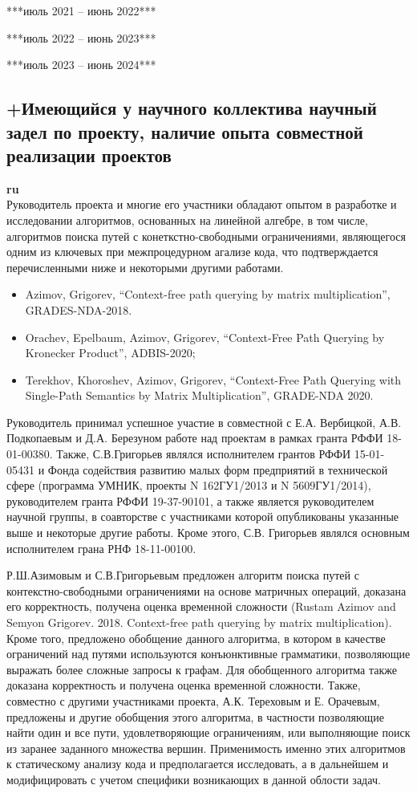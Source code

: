 \documentclass[12pt]{article}  %
\theoremstyle{remark}
\begin{document}
***июль 2021 -- июнь 2022***


***июль 2022 -- июнь 2023***


***июль 2023 -- июнь 2024***


\subsection{+Имеющийся у научного коллектива научный задел по проекту, наличие опыта совместной реализации проектов}

\textbf{ru}\\

Руководитель проекта и многие его участники обладают опытом в разработке и исследовании алгоритмов, основанных на линейной алгебре, в том числе, алгоритмов поиска путей с конеткстно-свободными ограничениями, являющегося одним из ключевых при межпроцедурном агализе кода, что подтверждается перечисленными ниже и некоторыми другими работами.
\begin{itemize}
  \item Azimov, Grigorev, ``Context-free path querying by matrix multiplication'', GRADES-NDA-2018.
  \item Orachev, Epelbaum, Azimov, Grigorev, ``Context-Free Path Querying by Kronecker Product'', ADBIS-2020;
  \item Terekhov, Khoroshev, Azimov, Grigorev, ``Context-Free Path Querying with Single-Path Semantics by Matrix Multiplication'', GRADE-NDA 2020.
\end{itemize}

Руководитель принимал успешное участие в совместной с Е.А. Вербицкой, А.В. Подкопаевым и Д.А. Березуном работе над проектам в рамках гранта РФФИ 18-01-00380. Также, С.В.Григорьев являлся исполнителем грантов РФФИ 15-01-05431 и Фонда содействия развитию малых форм предприятий в технической сфере (программа УМНИК, проекты N 162ГУ1/2013 и N 5609ГУ1/2014), руководителем гранта РФФИ 19-37-90101, а также является руководителем научной группы, в соавторстве с участниками которой опубликованы указанные выше и некоторые другие работы. Кроме этого, С.В. Григорьев являлся основным исполнителем грана РНФ 18-11-00100.  


Р.Ш.Азимовым и С.В.Григорьевым предложен алгоритм поиска путей с контекстно-свободными ограничениями на основе матричных операций, доказана его корректность, получена оценка временной сложности (Rustam Azimov and Semyon Grigorev. 2018. Context-free path querying by matrix multiplication). Кроме того, предложено обобщение данного алгоритма, в котором в качестве ограничений над путями используются конъюнктивные грамматики, позволяющие выражать более сложные запросы к графам. Для обобщенного алгоритма также доказана корректность и получена оценка временной сложности. Также, совместно с другими участниками проекта, А.К. Тереховым и Е. Орачевым, предложены и другие обобщения этого алгоритма, в частности позволяющие найти один и все пути, удовлетворяющие ограничениям, или выполняющие поиск из заранее заданного множества вершин. Применимость именно этих алгоритмов к статическому анализу кода и предполагается исследовать, а в дальнейшем и модифицировать с учетом специфики возникающих в данной облости задач.
\end{document}
